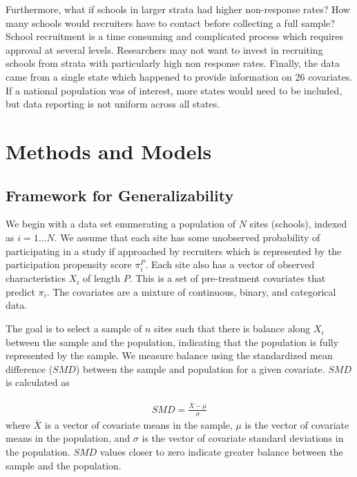 \documentclass[man,floatsintext]{apa6}
\begin{document}
Furthermore, what if schools in larger strata had higher non-response rates? How many schools would recruiters have to contact before collecting a full sample? School recruitment is a time consuming and complicated process which requires approval at several levels. Researchers may not want to invest in recruiting schools from strata with particularly high non response rates. Finally, the data came from a single state which happened to provide information on 26 covariates. If a national population was of interest, more states would need to be included, but data reporting is not uniform across all states.

\hypertarget{methods-and-models}{%
\section{Methods and Models}\label{methods-and-models}}

\hypertarget{framework-for-generalizability}{%
\subsection{Framework for Generalizability}\label{framework-for-generalizability}}

We begin with a data set enumerating a population of \(N\) sites (schools), indexed as \(i = 1 ... N\). We assume that each site has some unobserved probability of participating in a study if approached by recruiters which is represented by the participation propensity score \(\pi_i^P\). Each site also has a vector of observed characteristics \(X_i\) of length \(P\). This is a set of pre-treatment covariates that predict \(\pi_i\). The covariates are a mixture of continuous, binary, and categorical data.

The goal is to select a sample of \(n\) sites such that there is balance along \(X_i\) between the sample and the population, indicating that the population is fully represented by the sample. We measure balance using the standardized mean difference (\(SMD\)) between the sample and population for a given covariate. \(SMD\) is calculated as

\begin{align}
  SMD = \frac{\bar{X}-\mu}{\sigma}
\end{align}
where \(\bar{X}\) is a vector of covariate means in the sample, \(\mu\) is the vector of covariate means in the population, and \(\sigma\) is the vector of covariate standard deviations in the population. \(SMD\) values closer to zero indicate greater balance between the sample and the population.
\end{document}

